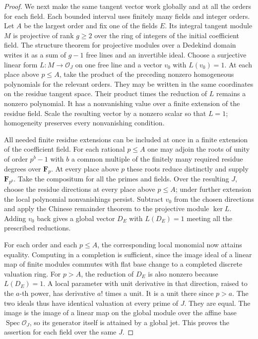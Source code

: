 \documentclass[a4paper,11pt]{article}
\theoremstyle{definition}
\theoremstyle{remark}
\numberwithin{equation}{section}
\newcommand{\OO}{\mathcal O}
\begin{document}
\begin{proof}
We next make the same tangent vector work globally and at all the orders for each field. Each bounded interval uses finitely many fields and integer orders. Let \(A\) be the largest order and fix one of the fields \(E\). Its integral tangent module \(M\) is projective of rank \(g\ge2\) over the ring of integers of the initial coefficient field. The structure theorem for projective modules over a Dedekind domain writes it as a sum of \(g-1\) free lines and an invertible ideal. Choose a surjective linear form \(L:M\to\OO_J\) on one free line and a vector \(v_0\) with \(L(v_0)=1\). At each place above \(p\le A\), take the product of the preceding nonzero homogeneous polynomials for the relevant orders. They may be written in the same coordinates on the residue tangent space. Their product times the reduction of \(L\) remains a nonzero polynomial. It has a nonvanishing value over a finite extension of the residue field. Scale the resulting vector by a nonzero scalar so that \(L=1\); homogeneity preserves every nonvanishing condition.

All needed finite residue extensions can be included at once in a finite extension of the coefficient field. For each rational \(p\le A\) one may adjoin the roots of unity of order \(p^b-1\) with \(b\) a common multiple of the finitely many required residue degrees over \(\mathbf F_p\). At every place above \(p\) these roots reduce distinctly and supply \(\mathbf F_{p^b}\). Take the compositum for all the primes and fields. Over the resulting \(J\), choose the residue directions at every place above \(p\le A\); under further extension the local polynomial nonvanishings persist. Subtract \(v_0\) from the chosen directions and apply the Chinese remainder theorem to the projective module \(\ker L\). Adding \(v_0\) back gives a global vector \(D_E\) with \(L(D_E)=1\) meeting all the prescribed reductions.

For each order and each \(p\le A\), the corresponding local monomial now attains equality. Computing in a completion is sufficient, since the image ideal of a linear map of finite modules commutes with flat base change to a completed discrete valuation ring. For \(p>A\), the reduction of \(D_E\) is also nonzero because \(L(D_E)=1\). A local parameter with unit derivative in that direction, raised to the \(a\)-th power, has derivative \(a!\) times a unit. It is a unit there since \(p>a\). The two ideals thus have identical valuation at every prime of \(J\). They are equal. The image is the image of a linear map on the global module over the affine base \(\operatorname{Spec}\OO_J\), so its generator itself is attained by a global jet. This proves the assertion for each field over the same \(J\).
\end{proof}
\end{document}
